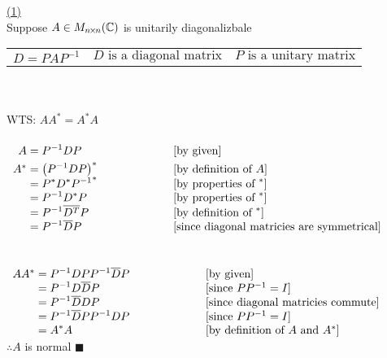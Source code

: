 \documentclass[12pt]{article}
\newcommand{\timesSmall}{{\mkern-2mu\times\mkern-2mu}}
\newcommand{\bigbracket}[1]{\big(#1\big)}
\renewcommand{\qed}{\hfill$\blacksquare$}
\begin{document}
\hyperlink{toc}{\hypertarget{1.1}{(1)}}\\
Suppose $A \in M_{n\timesSmall n}(\mathbb{C})$ is unitarily diagonalizbale\\
\begin{tabularx}{\textwidth}{>{\centering\arraybackslash}X  >{\centering\arraybackslash}X >{\centering\arraybackslash}X}
	$ D = PAP^{-1}$ & $D \text{ is a diagonal matrix}$ & $P \text{ is a unitary matrix}$
\end{tabularx}\\\\
WTS: $AA^* = A^*A$
\\\\
{$\begin{array}{r@{}>{\displaystyle}ll}
		A   & {}= P^{-1}DP                                 & [\text{by given}]\vspace*{1.2mm}                  \\
		A^* & {}= \bigbracket{P^{-1}DP}^{*} \hspace*{20mm} & [\text{by definition of } A]                      \\
		    & {}= P^*D^*{P^{-1}}^{*}                       & [\text{by properties of } ^*]                     \\
		    & {}=  P^{-1}D^*P                              & [\text{by properties of } ^*]                     \\
		    & {}=  P^{-1}\overline{D^T}P                   & [\text{by definition of } ^*]                     \\
		    & {}=  P^{-1}\overline{D}P                     & [\text{since diagonal matricies are symmetrical}] \\
	\end{array}$}\\
\\\\
{$\begin{array}{r@{}>{\displaystyle}ll}
		AA^* & {}= P^{-1}DP P^{-1}\overline{D}P \hspace*{20mm} & [\text{by given}]                            \\
		     & {}=  P^{-1}D\overline{D}P                       & [\text{since } PP^{-1}=I]                    \\
		     & {}=  P^{-1}\overline{D}DP                       & [\text{since diagonal matricies commute}]    \\
		     & {}=  P^{-1}\overline{D}P P^{-1}DP               & [\text{since } PP^{-1}=I]                    \\
		     & {}=  A^*A                                       & [\text{by definition of }A \text{ and } A^*] \\
	\end{array}$}\\
$\therefore A $ is normal \qed \newpage
\end{document}
